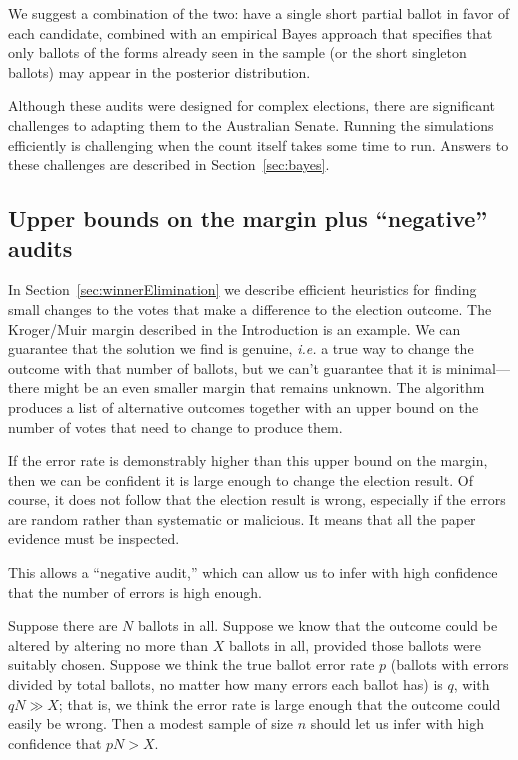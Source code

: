 \documentclass[10pt,a4paper]{article}
\newcommand{\shortVersion}[1]{}
\newcommand{\longVersion}[1]{#1}
\newcommand{\shortVersion}[1]{#1}
\newcommand{\longVersion}[1]{}
\begin{document}
We suggest a combination of the two: have a single short partial ballot in
favor of each candidate, combined with an empirical Bayes approach that
specifies that only ballots of the forms already seen in the sample
(or the short singleton ballots) may appear in the posterior distribution.

Although these audits were designed for complex elections, there are
significant challenges to adapting them to the Australian Senate.  
Running the simulations efficiently is challenging when the count itself takes
some time to run.  Answers to these challenges are described in
\shortVersion{the full version of the paper.}\longVersion{Section~\ref{sec:bayes}.}

\subsection{Upper bounds on the margin plus ``negative'' audits}  \label{subsec:upperBounds}
In \longVersion{Section~\ref{sec:winnerElimination}}\shortVersion{the full version of this paper} we describe efficient heuristics for finding small changes to the votes that make a difference to the election outcome.  The Kroger/Muir margin described in the Introduction is an example.     
We can guarantee that the solution we find is genuine, {\it i.e.} a true way to change the outcome with that number of ballots, but we can't guarantee that it is minimal---there might be an even smaller margin that remains unknown.  The algorithm produces a list of alternative outcomes together with an upper bound on the number of votes that need to change to produce them.

If the error rate is demonstrably higher than this upper bound on the margin, then we can be confident it is large enough to change the election result. Of course, it does not follow that the election result is wrong, especially if the errors are random rather than systematic or malicious.  It means that all the paper evidence must be inspected.  

This allows a ``negative audit,'' which can allow us to infer with high confidence that the number of errors is high enough.   

Suppose there are $N$ ballots in all.
Suppose we know that the outcome could be altered by altering no more than $X$ ballots in all, provided those ballots were suitably chosen.  Suppose
we think the true ballot error rate $p$ (ballots with errors divided by total ballots, no matter how many errors each ballot has) is $q$, with $qN \gg X$; that is, we think the error rate is large enough that the outcome could easily be wrong.  Then a modest sample
of size $n$ should let us infer with high confidence that $pN > X$. 
\end{document}
